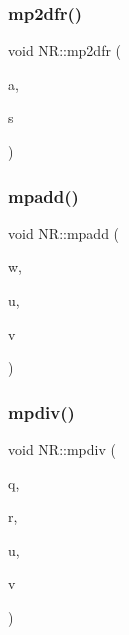 \subsubsection{\texorpdfstring{mp2dfr()}{mp2dfr()}}
{\footnotesize\ttfamily void N\+R\+::mp2dfr (\begin{DoxyParamCaption}\item[{\mbox{\hyperlink{namespaceNR_ad0cd08c957bbfcd9b612069da683fed4}{Vec\+\_\+\+I\+O\+\_\+\+U\+C\+HR}} \&}]{a,  }\item[{std\+::string \&}]{s }\end{DoxyParamCaption})}

\mbox{\label{namespaceNR_a2a17c9eb096bee049e90717500cc1d44}} 
\subsubsection{\texorpdfstring{mpadd()}{mpadd()}}
{\footnotesize\ttfamily void N\+R\+::mpadd (\begin{DoxyParamCaption}\item[{\mbox{\hyperlink{namespaceNR_ac322e5f1208609bf101390ed2495b7d5}{Vec\+\_\+\+O\+\_\+\+U\+C\+HR}} \&}]{w,  }\item[{\mbox{\hyperlink{namespaceNR_ace0fbcd7daadfbf5e4e7db2a317a5b46}{Vec\+\_\+\+I\+\_\+\+U\+C\+HR}} \&}]{u,  }\item[{\mbox{\hyperlink{namespaceNR_ace0fbcd7daadfbf5e4e7db2a317a5b46}{Vec\+\_\+\+I\+\_\+\+U\+C\+HR}} \&}]{v }\end{DoxyParamCaption})}

\mbox{\label{namespaceNR_a86e4bde392036558ab1428a568df4cc7}} 
\subsubsection{\texorpdfstring{mpdiv()}{mpdiv()}}
{\footnotesize\ttfamily void N\+R\+::mpdiv (\begin{DoxyParamCaption}\item[{\mbox{\hyperlink{namespaceNR_ac322e5f1208609bf101390ed2495b7d5}{Vec\+\_\+\+O\+\_\+\+U\+C\+HR}} \&}]{q,  }\item[{\mbox{\hyperlink{namespaceNR_ac322e5f1208609bf101390ed2495b7d5}{Vec\+\_\+\+O\+\_\+\+U\+C\+HR}} \&}]{r,  }\item[{\mbox{\hyperlink{namespaceNR_ace0fbcd7daadfbf5e4e7db2a317a5b46}{Vec\+\_\+\+I\+\_\+\+U\+C\+HR}} \&}]{u,  }\item[{\mbox{\hyperlink{namespaceNR_ace0fbcd7daadfbf5e4e7db2a317a5b46}{Vec\+\_\+\+I\+\_\+\+U\+C\+HR}} \&}]{v }\end{DoxyParamCaption})}

